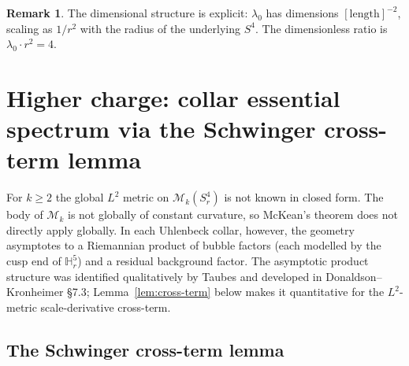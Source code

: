 \documentclass[11pt,letterpaper]{article}
\theoremstyle{definition}
\newtheorem{remark}[theorem]{Remark}
\newcommand{\bbH}{\mathbb{H}}
\newcommand{\cM}{\mathcal{M}}
\begin{document}
\begin{remark}\label{rmk:radius-units}
The dimensional structure is explicit: $\lambda_0$ has dimensions $[\mathrm{length}]^{-2}$, scaling as $1/r^2$ with the radius of the underlying $S^4$. The dimensionless ratio is $\lambda_0 \cdot r^2 = 4$.
\end{remark}

\section{Higher charge: collar essential spectrum via the Schwinger cross-term lemma}\label{sec:collar}

For $k \ge 2$ the global $L^2$ metric on $\cM_k(S^4_r)$ is not known in closed form. The body of $\cM_k$ is not globally of constant curvature, so McKean's theorem does not directly apply globally. In each Uhlenbeck collar, however, the geometry asymptotes to a Riemannian product of bubble factors (each modelled by the cusp end of $\bbH^5_r$) and a residual background factor. The asymptotic product structure was identified qualitatively by Taubes \cite{Taubes1988} and developed in Donaldson--Kronheimer \cite{DK1990} \S 7.3; Lemma~\ref{lem:cross-term} below makes it quantitative for the $L^2$-metric scale-derivative cross-term.

\subsection{The Schwinger cross-term lemma}
\end{document}
